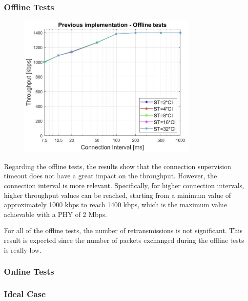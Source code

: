 \documentclass{Configuration_Files/PoliMi3i_thesis}
\begin{document}
\subsubsection*{Offline Tests}

\begin{figure}[H]
    \centering
    \includegraphics[width=0.8\textwidth]{Results Manuel/figure1}
    \label{fig:figure1}
\end{figure}

Regarding the offline tests, the results show that the connection supervision timeout does not have a great impact on the throughput. However, the connection interval is more relevant. Specifically, for higher connection intervals, higher throughput values can be reached, starting from a minimum value of approximately 1000 kbps to reach 1400 kbps, which is the maximum value achievable with a PHY of 2 Mbps.

For all of the offline tests, the number of retransmissions is not significant. This result is expected since the number of packets exchanged during the offline tests is really low.

\subsubsection*{Online Tests}

\subsubsection*{Ideal Case}
\end{document}
